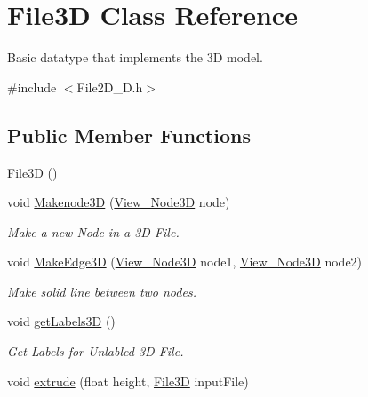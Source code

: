 \hypertarget{class_file3_d}{}\section{File3D Class Reference}
\label{class_file3_d}


Basic datatype that implements the 3D model.  




{\ttfamily \#include $<$File2\+D\+\_\+D.\+h$>$}

\subsection*{Public Member Functions}
\begin{DoxyCompactItemize}
\item 
\mbox{\hyperlink{class_file3_d_a463dcad9b7b6cecd026c856044e19de1}{File3D}} ()
\item 
\mbox{\label{class_file3_d_ad5bbb79fea57472a60a467c839be7cba}} 
void \mbox{\hyperlink{class_file3_d_ad5bbb79fea57472a60a467c839be7cba}{Makenode3D}} (\mbox{\hyperlink{class_view___node3_d}{View\+\_\+\+Node3D}} node)
\begin{DoxyCompactList}\small\item\em Make a new Node in a 3D File. \end{DoxyCompactList}\item 
\mbox{\label{class_file3_d_ab58f3056d80dbc701764f4e5d9d6b586}} 
void \mbox{\hyperlink{class_file3_d_ab58f3056d80dbc701764f4e5d9d6b586}{Make\+Edge3D}} (\mbox{\hyperlink{class_view___node3_d}{View\+\_\+\+Node3D}} node1, \mbox{\hyperlink{class_view___node3_d}{View\+\_\+\+Node3D}} node2)
\begin{DoxyCompactList}\small\item\em Make solid line between two nodes. \end{DoxyCompactList}\item 
void \mbox{\hyperlink{class_file3_d_a1ed0723d2c4ee571349b6efc7d5d4b48}{get\+Labels3D}} ()
\begin{DoxyCompactList}\small\item\em Get Labels for Unlabled 3D File. \end{DoxyCompactList}\item 
\mbox{\label{class_file3_d_a89a7a5c0bf778edf7e28ad3792ce0110}} 
void \mbox{\hyperlink{class_file3_d_a89a7a5c0bf778edf7e28ad3792ce0110}{extrude}} (float height, \mbox{\hyperlink{class_file3_d}{File3D}} input\+File)

\end{DoxyCompactItemize}
